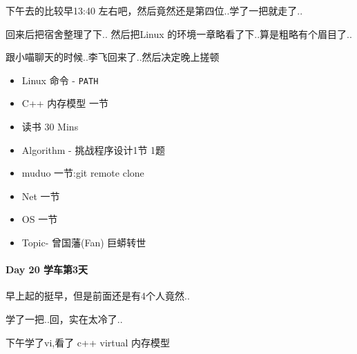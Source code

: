 \documentclass[UTF8,a4paper,8pt]{ctexart}
\begin{document}
	 	 下午去的比较早13:40 左右吧，然后竟然还是第四位..学了一把就走了..
	 	 
	 	 回来后把宿舍整理了下.. 然后把Linux 的环境一章略看了下..算是粗略有个眉目了..
	 	 
	 	 跟小喵聊天的时候..李飞回来了..然后决定晚上搓顿
	 	 \begin{itemize}
	 	 	\item  \makebox[0pt][l]{$\square$}\raisebox{.15ex}{\hspace{0.1em}$\checkmark$} Linux 命令 - \verb|PATH|
	 	 	\item  \makebox[0pt][l]{$\square$}\raisebox{.15ex}{\hspace{0.1em}$\checkmark$} C++ 内存模型 一节
	 	 	
	 	 	\item  \makebox[0pt][l]{$\square$}\raisebox{.15ex}{\hspace{0.1em}$\checkmark$} 读书  30 Mins		 	 
	 	 	\item  \makebox[0pt][l]{$\square$}\raisebox{.15ex}{\hspace{0.1em}$\checkmark$} Algorithm - 挑战程序设计1节 1题
	 	 	\item  \makebox[0pt][l]{$\square$}\raisebox{.15ex}{\hspace{0.1em}$\checkmark$} muduo 一节:git remote clone
	 	 	\item  Net 一节
	 	 	\item  OS  一节
	 	 	
	 	 	\item  \makebox[0pt][l]{$\square$}\raisebox{.15ex}{\hspace{0.1em}$\checkmark$} Topic- 曾国藩(Fan) 巨蟒转世
	 	 \end{itemize}
 	 \paragraph{Day 20  学车第3天    \quad     }
	 	 早上起的挺早，但是前面还是有4个人竟然..
	 	 
	 	 学了一把..回，实在太冷了..
	 	 
	 	 下午学了vi,看了 c++ virtual 内存模型
	 	 
\end{document}
